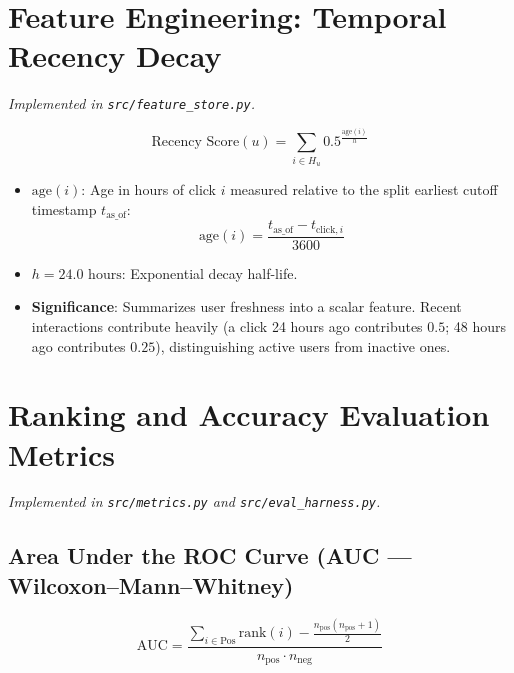 \documentclass[11pt,a4paper]{article}
\begin{document}
\section{Feature Engineering: Temporal Recency Decay}
\textit{Implemented in \texttt{src/feature\_store.py}.}

\begin{equation}
\text{Recency Score}(u) = \sum_{i \in H_u} 0.5^{\frac{\text{age}(i)}{h}}
\end{equation}

\begin{itemize}
  \item $\text{age}(i)$: Age in hours of click $i$ measured relative to the split earliest cutoff timestamp $t_{\text{as\_of}}$:
  \begin{equation}
  \text{age}(i) = \frac{t_{\text{as\_of}} - t_{\text{click}, i}}{3600}
  \end{equation}
  \item $h = 24.0\text{ hours}$: Exponential decay half-life.
  \item \textbf{Significance}: Summarizes user freshness into a scalar feature. Recent interactions contribute heavily (a click 24 hours ago contributes $0.5$; 48 hours ago contributes $0.25$), distinguishing active users from inactive ones.
\end{itemize}

\section{Ranking and Accuracy Evaluation Metrics}
\textit{Implemented in \texttt{src/metrics.py} and \texttt{src/eval\_harness.py}.}

\subsection{Area Under the ROC Curve (AUC --- Wilcoxon--Mann--Whitney)}
\begin{equation}
\text{AUC} = \frac{\sum_{i \in \text{Pos}} \text{rank}(i) - \frac{n_{\text{pos}}(n_{\text{pos}} + 1)}{2}}{n_{\text{pos}} \cdot n_{\text{neg}}}
\end{equation}
\end{document}
